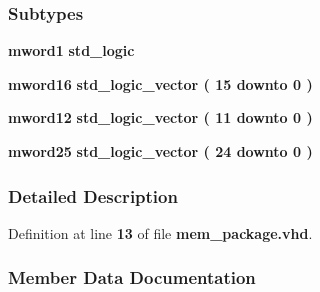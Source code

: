 \subsubsection*{Subtypes}
 \begin{DoxyCompactItemize}
\item 
{\bf mword1} {\bfseries \textcolor{comment}{std\+\_\+logic}\textcolor{vhdlchar}{ }} 
\item 
{\bf mword16} {\bfseries \textcolor{comment}{std\+\_\+logic\+\_\+vector}\textcolor{vhdlchar}{ }\textcolor{vhdlchar}{(}\textcolor{vhdlchar}{ }\textcolor{vhdlchar}{ } \textcolor{vhdldigit}{15} \textcolor{vhdlchar}{ }\textcolor{keywordflow}{downto}\textcolor{vhdlchar}{ }\textcolor{vhdlchar}{ } \textcolor{vhdldigit}{0} \textcolor{vhdlchar}{ }\textcolor{vhdlchar}{)}\textcolor{vhdlchar}{ }} 
\item 
{\bf mword12} {\bfseries \textcolor{comment}{std\+\_\+logic\+\_\+vector}\textcolor{vhdlchar}{ }\textcolor{vhdlchar}{(}\textcolor{vhdlchar}{ }\textcolor{vhdlchar}{ } \textcolor{vhdldigit}{11} \textcolor{vhdlchar}{ }\textcolor{keywordflow}{downto}\textcolor{vhdlchar}{ }\textcolor{vhdlchar}{ } \textcolor{vhdldigit}{0} \textcolor{vhdlchar}{ }\textcolor{vhdlchar}{)}\textcolor{vhdlchar}{ }} 
\item 
{\bf mword25} {\bfseries \textcolor{comment}{std\+\_\+logic\+\_\+vector}\textcolor{vhdlchar}{ }\textcolor{vhdlchar}{(}\textcolor{vhdlchar}{ }\textcolor{vhdlchar}{ } \textcolor{vhdldigit}{24} \textcolor{vhdlchar}{ }\textcolor{keywordflow}{downto}\textcolor{vhdlchar}{ }\textcolor{vhdlchar}{ } \textcolor{vhdldigit}{0} \textcolor{vhdlchar}{ }\textcolor{vhdlchar}{)}\textcolor{vhdlchar}{ }} 
\end{DoxyCompactItemize}


\subsubsection{Detailed Description}


Definition at line {\bf 13} of file {\bf mem\+\_\+package.\+vhd}.



\subsubsection{Member Data Documentation}
\paragraph[{ieee}]{\hspace{0.3cm}{\ttfamily [Library]}}\label{classmem__package_a0a6af6eef40212dbaf130d57ce711256}


